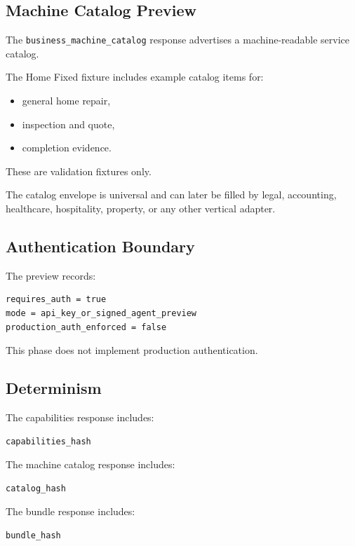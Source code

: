 \subsection{Machine Catalog Preview}

The \texttt{business\_machine\_catalog} response advertises a machine-readable service catalog.

The Home Fixed fixture includes example catalog items for:

\begin{itemize}
  \item general home repair,
  \item inspection and quote,
  \item completion evidence.
\end{itemize}

These are validation fixtures only.

The catalog envelope is universal and can later be filled by legal, accounting, healthcare, hospitality, property, or any other vertical adapter.

\subsection{Authentication Boundary}

The preview records:

\begin{verbatim}
requires_auth = true
mode = api_key_or_signed_agent_preview
production_auth_enforced = false
\end{verbatim}

This phase does not implement production authentication.

\subsection{Determinism}

The capabilities response includes:

\begin{verbatim}
capabilities_hash
\end{verbatim}

The machine catalog response includes:

\begin{verbatim}
catalog_hash
\end{verbatim}

The bundle response includes:

\begin{verbatim}
bundle_hash
\end{verbatim}

